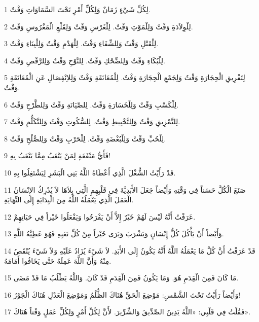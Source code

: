 \par 1 لِكُلِّ شَيْءٍ زَمَانٌ وَلِكُلِّ أَمْرٍ تَحْتَ السَّمَاوَاتِ وَقْتٌ.
\par 2 لِلْوِلاَدَةِ وَقْتٌ وَلِلْمَوْتِ وَقْتٌ. لِلْغَرْسِ وَقْتٌ وَلِقَلْعِ الْمَغْرُوسِ وَقْتٌ.
\par 3 لِلْقَتْلِ وَقْتٌ وَلِلشِّفَاءِ وَقْتٌ. لِلْهَدْمِ وَقْتٌ وَلِلْبِنَاءِ وَقْتٌ.
\par 4 لِلْبُكَاءِ وَقْتٌ وَلِلضِّحْكِ وَقْتٌ. لِلنَّوْحِ وَقْتٌ وَلِلرَّقْصِ وَقْتٌ.
\par 5 لِتَفْرِيقِ الْحِجَارَةِ وَقْتٌ وَلِجَمْعِ الْحِجَارَةِ وَقْتٌ. لِلْمُعَانَقَةِ وَقْتٌ وَلِلاِنْفِصَالِ عَنِ الْمُعَانَقَةِ وَقْتٌ.
\par 6 لِلْكَسْبِ وَقْتٌ وَلِلْخَسَارَةِ وَقْتٌ. لِلصِّيَانَةِ وَقْتٌ وَلِلطَّرْحِ وَقْتٌ.
\par 7 لِلتَّمْزِيقِ وَقْتٌ وَلِلتَّخْيِيطِ وَقْتٌ. لِلسُّكُوتِ وَقْتٌ وَلِلتَّكَلُّمِ وَقْتٌ.
\par 8 لِلْحُبِّ وَقْتٌ وَلِلْبُغْضَةِ وَقْتٌ. لِلْحَرْبِ وَقْتٌ وَلِلصُّلْحِ وَقْتٌ.
\par 9 فَأَيُّ مَنْفَعَةٍ لِمَنْ يَتْعَبُ مِمَّا يَتْعَبُ بِهِ!
\par 10 قَدْ رَأَيْتُ الشُّغْلَ الَّذِي أَعْطَاهُ اللَّهُ بَنِي الْبَشَرِ لِيَشْتَغِلُوا بِهِ.
\par 11 صَنَعَ الْكُلَّ حَسَناً فِي وَقْتِهِ وَأَيْضاً جَعَلَ الأَبَدِيَّةَ فِي قَلْبِهِمِ الَّتِي بِلاَهَا لاَ يُدْرِكُ الإِنْسَانُ الْعَمَلَ الَّذِي يَعْمَلُهُ اللَّهُ مِنَ الْبِدَايَةِ إِلَى النِّهَايَةِ.
\par 12 عَرَفْتُ أَنَّهُ لَيْسَ لَهُمْ خَيْرٌ إِلاَّ أَنْ يَفْرَحُوا وَيَفْعَلُوا خَيْراً فِي حَيَاتِهِمْ.
\par 13 وَأَيْضاً أَنْ يَأْكُلَ كُلُّ إِنْسَانٍ وَيَشْرَبَ وَيَرَى خَيْراً مِنْ كُلِّ تَعَبِهِ فَهُوَ عَطِيَّةُ اللَّهِ.
\par 14 قَدْ عَرَفْتُ أَنَّ كُلَّ مَا يَعْمَلُهُ اللَّهُ أَنَّهُ يَكُونُ إِلَى الأَبَدِ. لاَ شَيْءَ يُزَادُ عَلَيْهِ وَلاَ شَيْءَ يُنْقَصُ مِنْهُ وَأَنَّ اللَّهَ عَمِلَهُ حَتَّى يَخَافُوا أَمَامَهُ.
\par 15 مَا كَانَ فَمِنَ الْقِدَمِ هُوَ. وَمَا يَكُونُ فَمِنَ الْقِدَمِ قَدْ كَانَ. وَاللَّهُ يَطْلُبُ مَا قَدْ مَضَى.
\par 16 وَأَيْضاً رَأَيْتُ تَحْتَ الشَّمْسِ: مَوْضِعَ الْحَقِّ هُنَاكَ الظُّلْمُ وَمَوْضِعَ الْعَدْلِ هُنَاكَ الْجَوْرُ!
\par 17 فَقُلْتُ فِي قَلْبِي: «اللَّهُ يَدِينُ الصِّدِّيقَ وَالشِّرِّيرَ. لأَنَّ لِكُلِّ أَمْرٍ وَلِكُلِّ عَمَلٍ وَقْتاً هُنَاكَ».
